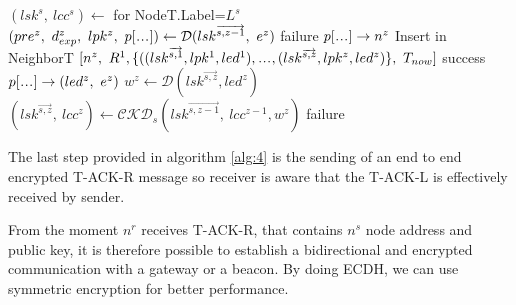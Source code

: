 \documentclass[12pt,oneside]{wlscirep}
\newcommand\xdots{\makebox[1em][c]{.\hfil.\hfil.}}
\DeclareRobustCommand{\kder}[1]{{\overrightarrow{{#1}}}}
\begin{document}
\begin{algorithm}[H]
\caption{Sender s, acknowledge reception processing.}
\label{alg:5}
\begin{algorithmic}[1]
	\State $(lsk^s,~lcc^s) \gets$ for NodeT.Label=$L^s$ 
    	\State $(pre^z,~d_{exp}^z,~lpk^z,~p[\xdots]) \gets \mathcal{D}(lsk^\kder{s,z-1},~e^z)$
			\State \Return failure
		\EndIf 
    		\State $p[\xdots] \to n^{z}$
            \State Insert in NeighborT $[n^{z},~R^1,\{((lsk^\kder{s,1}, lpk^1, led^1),\xdots,(lsk^\kder{s,z}, lpk^z, led^z)\},~T_{now}]$ 
            \State \Return success
        	\State $p[\xdots] \to (led^z,~e^{z})$
			\State $w^z \gets \mathcal{D}(lsk^\kder{s,z},led^z)$
			\State $(lsk^\kder{s,z},~lcc^z) \gets \mathcal{CKD}_s(lsk^\kder{s,z-1}, ~lcc^{z-1}, w^z)$
        \Else
			\State \Return failure
        \EndIf 
    \EndFor
\EndFunction
\end{algorithmic}
\end{algorithm}
The last step provided in algorithm \ref{alg:4} is the sending of an end to end encrypted T-ACK-R message so receiver is aware that the T-ACK-L is effectively received by sender.\par
From the moment $n^r$ receives T-ACK-R, that contains $n^s$ node address and public key, it is therefore possible to establish a bidirectional and encrypted communication with a gateway or a beacon. By doing ECDH, we can use symmetric encryption for better performance.\par
\end{document}
